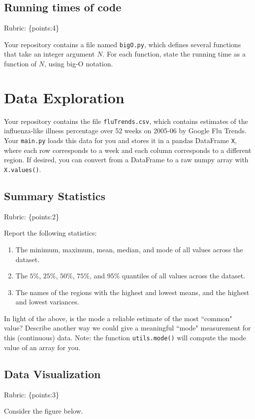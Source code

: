 \documentclass{article}
\def\rubric#1{\gre{Rubric: \{#1\}}}{}
\def\blu#1{{\color{blu}#1}}
\def\gre#1{{\color{gre}#1}}
\def\enum#1{\begin{enumerate}#1\end{enumerate}}
\begin{document}
	\subsection{Running times of code}
	\rubric{points:4}

	Your repository contains a file named \texttt{bigO.py}, which defines several functions
	that take an integer argument $N$. For each function, \blu{state the running time as a function of $N$, using big-O notation}.

	\section{Data Exploration}


	Your repository contains the file \texttt{fluTrends.csv}, which contains estimates
	of the influenza-like illness percentage over 52 weeks on 2005-06 by Google Flu Trends.
	Your \texttt{main.py} loads this data for you and stores it in a pandas DataFrame \texttt{X},
	where each row corresponds to a week and each column
	corresponds to a different
	region. If desired, you can convert from a DataFrame to a raw numpy array with \texttt{X.values()}.

	\subsection{Summary Statistics}
	\rubric{points:2}

	\blu{Report the following statistics}:
	\enum{
		\item The minimum, maximum, mean, median, and mode of all values across the dataset.
		\item The $5\%$, $25\%$, $50\%$, $75\%$, and $95\%$ quantiles of all values across the dataset.
		\item The names of the regions with the highest and lowest means, and the highest and lowest variances.
	}
	In light of the above, \blu{is the mode a reliable estimate of the most ``common" value? Describe another way we could give a meaningful ``mode" measurement for this (continuous) data.} Note: the function \texttt{utils.mode()} will compute the mode value of an array for you.




	\subsection{Data Visualization}
	\rubric{points:3}

	Consider the figure below.
\end{document}
